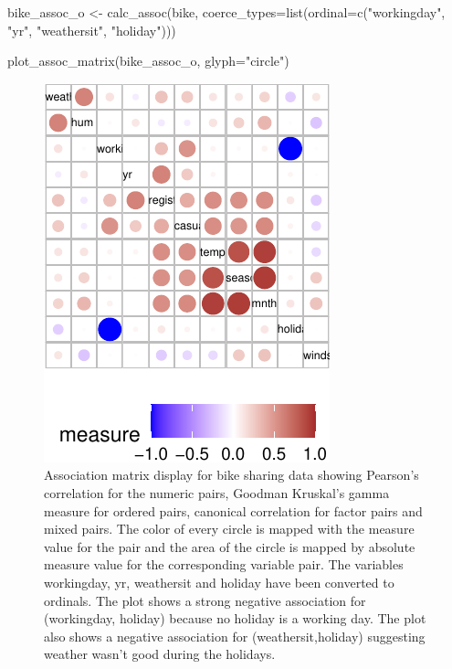 \begin{Schunk}
\begin{Sinput}
bike_assoc_o <- calc_assoc(bike, 
                           coerce_types=list(ordinal=c("workingday", 
                                                       "yr", 
                                                       "weathersit", 
                                                       "holiday")))

plot_assoc_matrix(bike_assoc_o, glyph="circle")
\end{Sinput}
\begin{figure}

{\centering \includegraphics{rj_paper_files/figure-latex/coerce_types_display-1} 

}

\caption[Association matrix display for bike sharing data showing Pearson's correlation for the numeric pairs, Goodman Kruskal's gamma measure for ordered pairs, canonical correlation for factor pairs and mixed pairs]{Association matrix display for bike sharing data showing Pearson's correlation for the numeric pairs, Goodman Kruskal's gamma measure for ordered pairs, canonical correlation for factor pairs and mixed pairs. The color of every circle is mapped with the measure value for the pair and the area of the circle is mapped by absolute measure value for the corresponding variable pair. The variables workingday, yr, weathersit and holiday have been converted to ordinals. The plot shows a strong negative association for (workingday, holiday) because no holiday is a working day. The plot also shows a negative association for (weathersit,holiday) suggesting weather wasn't good during the holidays.}\label{fig:coerce_types_display}
\end{figure}
\end{Schunk}

